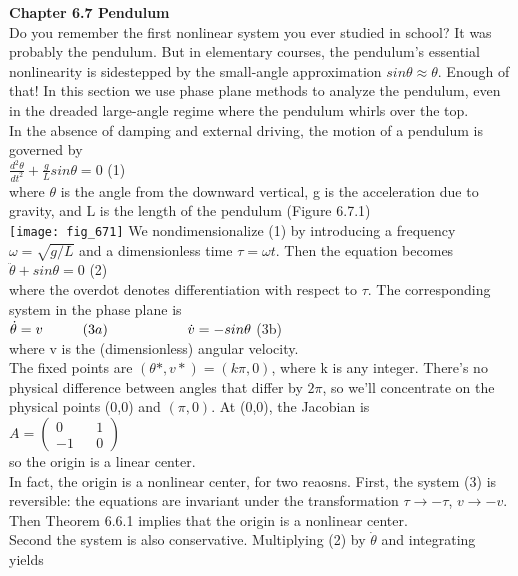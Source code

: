 \documentclass{article}
\newcommand\tab[1][1cm]{\hspace*{#1}}
\begin{document}
\textbf {Chapter 6.7 Pendulum} \\ Do you remember the first nonlinear system you ever studied in school? It was probably the pendulum. But in elementary courses, the pendulum's essential nonlinearity is sidestepped by the small-angle approximation $sin \theta \approx \theta$. Enough of that! In this section we use phase plane methods to analyze the pendulum, even in the dreaded large-angle regime where the pendulum whirls over the top. \\ \tab
In the absence of damping and external driving, the motion of a pendulum is governed by
\\ \tab \tab $\frac{d^{2}\theta}{dt^{2}}+\frac{g}{L}sin\theta = 0$ \tab (1) \\
where $\theta$ is the angle from the downward vertical, g is the acceleration due to gravity, and L is the length of the pendulum (Figure 6.7.1) \\
\texttt{[image: fig\_671]} 
We nondimensionalize (1) by introducing a frequency $\omega = \sqrt{g/L}$ and a dimensionless time $\tau = \omega t$. Then the equation becomes \\ \tab \tab
$\ddot{\theta}+sin\theta = 0$ \tab (2) \\
where the overdot denotes differentiation with respect to $\tau$. The corresponding system in the phase plane is \\ \tab \tab
$\dot{\theta}=v \tab (3a) \\
\tab \tab \dot{v}=-sin\theta$ \tab (3b) \\ 
where v is the (dimensionless) angular velocity. \\ \tab 
The fixed points are $(\theta * , v*)=(k\pi , 0)$, where k is any integer. There's no physical difference between angles that differ by $2\pi$, so we'll concentrate on the physical points (0,0) and $(\pi , 0)$. At (0,0), the Jacobian is \\ \tab 
$A={
\begin{pmatrix}
0 && 1 \\
-1 && 0
\end{pmatrix}
}$ \\ 
so the origin is a linear center. \\ \tab
In fact, the origin is a nonlinear center, for two reaosns. First, the system (3) is reversible: the equations are invariant under the transformation $\tau \to -\tau$, $v \to -v$. Then Theorem 6.6.1 implies that the origin is a nonlinear center. \\ \tab 
Second the system is also conservative. Multiplying (2) by $\dot{\theta}$ and integrating yields \\ \tab \tab
\end{document}
